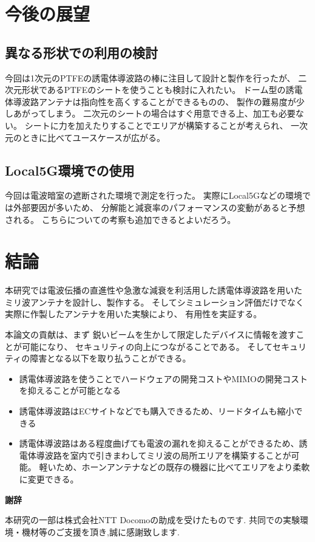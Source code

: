 \documentclass[technicalreport]{ieicej}
\begin{document}

\section{今後の展望}

\subsection{異なる形状での利用の検討}

今回は1次元のPTFEの誘電体導波路の棒に注目して設計と製作を行ったが、
二次元形状であるPTFEのシートを使うことも検討に入れたい。
ドーム型の誘電体導波路アンテナは指向性を高くすることができるものの、
製作の難易度が少しあがってしまう。
二次元のシートの場合はすぐ用意できる上、加工も必要ない。
シートに力を加えたりすることでエリアが構築することが考えられ、
一次元のときに比べてユースケースが広がる。

\subsection{Local5G環境での使用}

今回は電波暗室の遮断された環境で測定を行った。
実際にLocal5Gなどの環境では外部要因が多いため、
分解能と減衰率のパフォーマンスの変動があると予想される。
こちらについての考察も追加できるとよいだろう。

\section{結論}

本研究では電波伝播の直進性や急激な減衰を利活用した誘電体導波路を用いた
ミリ波アンテナを設計し、製作する。
そしてシミュレーション評価だけでなく実際に作製したアンテナを用いた実験により、
有用性を実証する。

本論文の貢献は、まず
鋭いビームを生かして限定したデバイスに情報を渡すことが可能になり、
セキュリティの向上につながることである。
そしてセキュリティの障害となる以下を取り払うことができる。

\begin{itemize}
  \item 誘電体導波路を使うことでハードウェアの開発コストやMIMOの開発コストを抑えることが可能となる
  \item 誘電体導波路はECサイトなどでも購入できるため、リードタイムも縮小できる
  \item 誘電体導波路はある程度曲げても電波の漏れを抑えることができるため、誘電体導波路を室内で引きまわしてミリ波の局所エリアを構築することが可能。
  軽いため、ホーンアンテナなどの既存の機器に比べてエリアをより柔軟に変更できる。
\end{itemize}

\begin{center}
  \Large \textbf{謝辞}
\end{center}

本研究の一部は株式会社NTT Docomoの助成を受けたものです.
共同での実験環境・機材等のご支援を頂き,誠に感謝致します.

%
%

\end{document}
